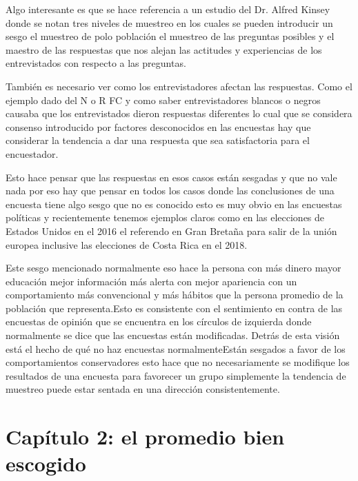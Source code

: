 \documentclass[letterpaper, 11pt]{article}
\begin{document}
 Algo interesante es que se hace referencia a un estudio del Dr. Alfred Kinsey donde se notan tres niveles de muestreo en los cuales se pueden introducir un sesgo el muestreo de polo población el muestreo de las preguntas posibles y el maestro de las respuestas que nos alejan las actitudes y experiencias de los entrevistados con respecto a las preguntas.
 
 También es necesario ver como los entrevistadores afectan las respuestas. Como el ejemplo dado del N o R FC y como saber entrevistadores blancos o negros causaba que los entrevistados dieron respuestas diferentes lo cual que se considera consenso introducido por factores desconocidos en las encuestas hay que considerar la tendencia a dar una respuesta que sea satisfactoria para el encuestador.
 
 Esto hace pensar que las respuestas en esos casos están sesgadas y que no vale nada por eso hay que pensar en todos los casos donde las conclusiones de una encuesta tiene algo sesgo que no es conocido esto es muy obvio en las encuestas políticas y recientemente tenemos ejemplos claros como en las elecciones de Estados Unidos en el 2016 el referendo en Gran Bretaña para salir de la unión europea inclusive las elecciones de Costa Rica en el 2018.
 
 Este sesgo mencionado normalmente eso hace la persona con más dinero mayor educación mejor información más alerta con mejor apariencia con un comportamiento más convencional y más hábitos que la persona promedio de la población que representa.Esto es consistente con el sentimiento en contra de las encuestas de opinión que se encuentra en los círculos de izquierda donde normalmente se dice que las encuestas están modificadas. Detrás de esta visión está el hecho de qué no haz encuestas normalmenteEstán sesgados a favor de los comportamientos conservadores esto hace que no necesariamente se modifique los resultados de una encuesta para favorecer un grupo simplemente la tendencia de muestreo puede estar sentada en una dirección consistentemente.
 
\section*{Capítulo 2: el promedio bien escogido}
\end{document}
